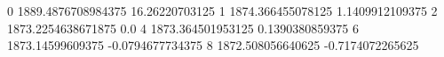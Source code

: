 0 1889.4876708984375 16.26220703125
1 1874.366455078125 1.1409912109375
2 1873.2254638671875 0.0
4 1873.364501953125 0.1390380859375
6 1873.14599609375 -0.0794677734375
8 1872.508056640625 -0.7174072265625

